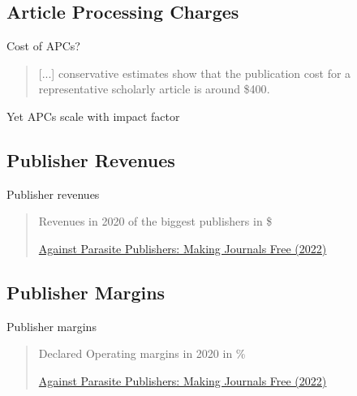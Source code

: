 \documentclass[10pt,compress,serif,aspectratio=169]{beamer}
\begin{document}
\subsection{Article Processing Charges}
\begin{frame}[t]{Cost of APCs?}

  \begin{quote}
   [...] conservative estimates show that the publication cost for a representative scholarly article \alert{is around \$400}.
 \end{quote}
 \pause

 \begin{center}
 \alert{\Large Yet APCs scale with impact factor}\\
 \end{center}

 \pause

\end{frame}


\subsection{Publisher Revenues}
\begin{frame}[t]{Publisher revenues}
 \begin{quote}
   Revenues in 2020 of the biggest publishers in \$

   \href{https://doi.org/10.5281/zenodo.7212922}{Against Parasite Publishers: Making Journals Free (2022)}

 \end{quote}
\end{frame}

\subsection{Publisher Margins}
\begin{frame}[t]{Publisher margins}
 \begin{quote}

   Declared Operating margins in 2020 in \%

   \href{https://doi.org/10.5281/zenodo.7212922}{Against Parasite Publishers: Making Journals Free (2022)}


\end{quote}
\end{frame}

\end{document}
